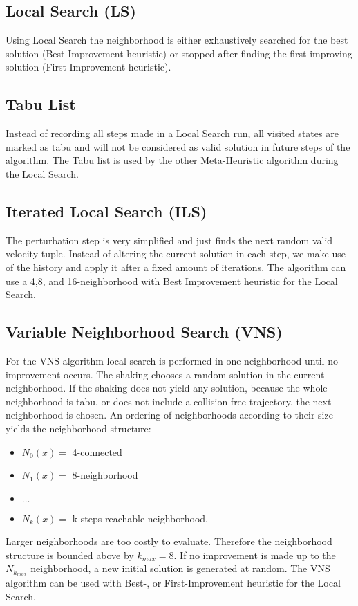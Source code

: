 \subsection{Local Search (LS)}
Using Local Search the neighborhood is either exhaustively searched for the best solution (Best-Improvement heuristic) or stopped after finding the first improving solution (First-Improvement heuristic).

\subsection{Tabu List}
Instead of recording all steps made in a Local Search run, all visited states are marked as tabu and will not be considered as valid solution in future steps of the algorithm. 
The Tabu list is used by the other Meta-Heuristic algorithm during the Local Search.

\subsection{Iterated Local Search (ILS)}
The perturbation step is very simplified and just finds the next random valid velocity tuple. 
Instead of altering the current solution in each step, we make use of the history and apply it after a fixed amount of iterations. 
The algorithm can use a 4,8, and 16-neighborhood with Best Improvement heuristic for the Local Search.

\subsection{Variable Neighborhood Search (VNS)}
For the VNS algorithm local search is performed in one neighborhood until no improvement occurs. 
The shaking chooses a random solution in the current neighborhood. 
If the shaking does not yield any solution, because the whole neighborhood is tabu, or does not include a collision free trajectory, the next neighborhood is chosen. 
An ordering of neighborhoods according to their size yields the neighborhood structure:
\begin{itemize}
 \item $N_0(x)=$ 4-connected
 \item $N_1(x)=$ 8-neighborhood
 \item $\dots$
 \item $N_k(x)=$ k-steps reachable neighborhood.
\end{itemize}
Larger neighborhoods are too costly to evaluate. 
Therefore the neighborhood structure is bounded above by $k_{max}=8$. 
If no improvement is made up to the $N_{k_{max}}$ neighborhood, a new initial solution is generated at random. 
The VNS algorithm can be used with Best-, or First-Improvement heuristic for the Local Search.

